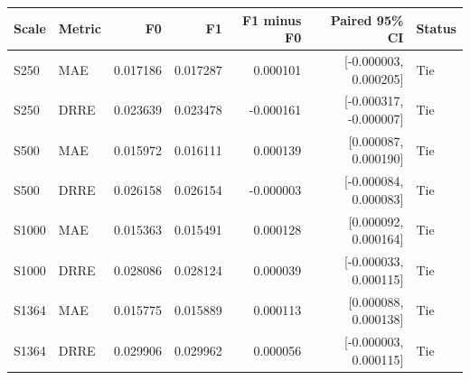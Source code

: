 \begin{center}
\begin{minipage}{\linewidth}
\centering
\small
\setlength{\tabcolsep}{4pt}
\label{tab:f0f1}
\begin{tabular}{llrrrrl}
\toprule
Scale & Metric & F0 & F1 & F1 minus F0 & Paired 95\% CI & Status \\
\midrule
S250 & MAE & 0.017186 & 0.017287 & 0.000101 & [-0.000003, 0.000205] & Tie \\
S250 & DRRE & 0.023639 & 0.023478 & -0.000161 & [-0.000317, -0.000007] & Tie \\
S500 & MAE & 0.015972 & 0.016111 & 0.000139 & [0.000087, 0.000190] & Tie \\
S500 & DRRE & 0.026158 & 0.026154 & -0.000003 & [-0.000084, 0.000083] & Tie \\
S1000 & MAE & 0.015363 & 0.015491 & 0.000128 & [0.000092, 0.000164] & Tie \\
S1000 & DRRE & 0.028086 & 0.028124 & 0.000039 & [-0.000033, 0.000115] & Tie \\
S1364 & MAE & 0.015775 & 0.015889 & 0.000113 & [0.000088, 0.000138] & Tie \\
S1364 & DRRE & 0.029906 & 0.029962 & 0.000056 & [-0.000003, 0.000115] & Tie \\
\bottomrule
\end{tabular}
\end{minipage}
\end{center}
